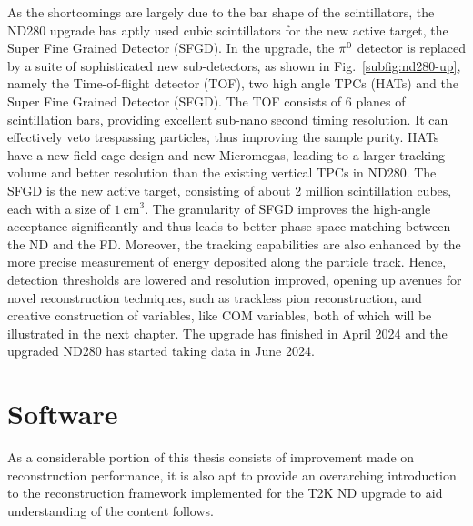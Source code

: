   As the shortcomings are largely due to the bar shape of the scintillators, the ND280 upgrade has aptly used cubic scintillators for the new active target, the Super Fine Grained Detector (SFGD).
  In the upgrade, the $\pi^0$ detector is replaced by a suite of sophisticated new sub-detectors, as shown in Fig.~\ref{subfig:nd280-up}, namely the Time-of-flight detector (TOF), two high angle TPCs (HATs) and the Super Fine Grained Detector (SFGD). 
  The TOF consists of 6 planes of scintillation bars, providing excellent sub-nano second timing resolution. 
  It can effectively veto trespassing particles, thus improving the sample purity.
  HATs have a new field cage design and new Micromegas, leading to a larger tracking volume and better resolution than the existing vertical TPCs in ND280. 
  The SFGD is the new active target, consisting of about 2 million scintillation cubes, each with a size of $1~\textrm{cm}^3$. 
  The granularity of SFGD improves the high-angle acceptance significantly and thus leads to better phase space matching between the ND and the FD. 
  Moreover, the tracking capabilities are also enhanced by the more precise measurement of energy deposited along the particle track. 
  Hence, detection thresholds are lowered and resolution improved, opening up avenues for novel reconstruction techniques, such as trackless pion reconstruction, and creative construction of variables, like COM variables, both of which will be illustrated in the next chapter. 
  The upgrade has finished in April 2024 and the upgraded ND280 has started taking data in June 2024. 
  

\section{Software}
  \label{sec:t2k-sw}
  As a considerable portion of this thesis consists of improvement made on reconstruction performance, it is also apt to provide an overarching introduction to the reconstruction framework implemented for the T2K ND upgrade to aid understanding of the content follows.

